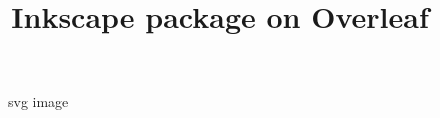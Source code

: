 \documentclass{article}
\title{Inkscape package on Overleaf }
\begin{document}
\maketitle

\begin{figure}[htbp]
  \centering
  
  \caption{svg image}
\end{figure}
\end{document}
